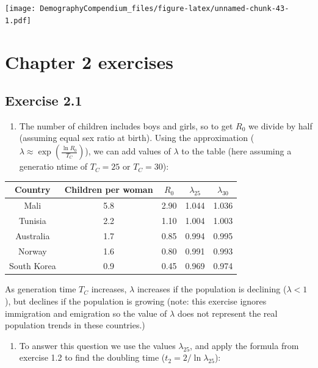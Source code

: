 \documentclass[
]{book}
\providecommand{\tightlist}{%
  \setlength{\itemsep}{0pt}\setlength{\parskip}{0pt}}
\begin{document}
\texttt{[image: DemographyCompendium\_files/figure-latex/unnamed-chunk-43-1.pdf]}

\hypertarget{chapter-2-exercises}{%
\section{Chapter 2 exercises}\label{chapter-2-exercises}}

\hypertarget{exercise-2.1-1}{%
\subsection*{Exercise 2.1}\label{exercise-2.1-1}}

\begin{enumerate}
\def\labelenumi{\arabic{enumi}.}
\tightlist
\item
  The number of children includes boys and girls, so to get \(R_0\) we divide by half (assuming equal sex ratio at birth). Using the approximation (\(\lambda\approx \exp\left(\frac{\ln R_0}{T_C}\right)\)), we can add values of \(\lambda\) to the table (here assuming a generatio ntime of \(T_C=25\) or \(T_C=30\)):
\end{enumerate}

\begin{tabular}{ccccc}
\toprule
Country & Children per woman & $R_0$ & $\lambda_{25}$ & $\lambda_{30}$\\
\midrule
Mali & 5.8 & 2.90 & 1.044 & 1.036\\
Tunisia & 2.2 & 1.10 & 1.004 & 1.003\\
Australia & 1.7 & 0.85 & 0.994 & 0.995\\
Norway & 1.6 & 0.80 & 0.991 & 0.993\\
South Korea & 0.9 & 0.45 & 0.969 & 0.974\\
\bottomrule
\end{tabular}

As generation time \(T_C\) increases, \(\lambda\) increases if the population is declining (\(\lambda<1\)), but declines if the population is growing (note: this exercise ignores immigration and emigration so the value of \(\lambda\) does not represent the real population trends in these countries.)

\begin{enumerate}
\def\labelenumi{\arabic{enumi}.}
\setcounter{enumi}{1}
\tightlist
\item
  To answer this question we use the values \(\lambda_{25}\), and apply the formula from exercise 1.2 to find the doubling time (\(t_{2}=2/\ln \lambda_{25}\)):
\end{enumerate}
\end{document}
